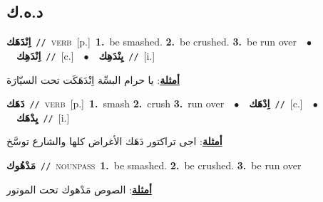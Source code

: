 \documentclass[10pt,a4paper,twoside]{article} %
\begin{document}
\begin{multicols}{2}
\vspace{-3mm}
\subsection*{\color{blue}\foreignlanguage{arabic}{د.ه.ك}\color{blue}{}} 

{\setlength\topsep{0pt}\textbf{\foreignlanguage{arabic}{اِنْدَهَك}}\ {\color{gray}\texttt{//}\color{black}}\ \textsc{verb}\ [p.]\ \textbf{1.}~be smashed.  \textbf{2.}~be crushed.  \textbf{3.}~be run over\ \ $\bullet$\ \ \setlength\topsep{0pt}\textbf{\foreignlanguage{arabic}{اِنْدَهِك}}\ {\color{gray}\texttt{//}\color{black}}\ [c.]\ \ $\bullet$\ \ \setlength\topsep{0pt}\textbf{\foreignlanguage{arabic}{يِنْدَهِك}}\ {\color{gray}\texttt{//}\color{black}}\ [i.]\  \begin{flushright}\color{gray}\foreignlanguage{arabic}{\textbf{\underline{\foreignlanguage{arabic}{أمثلة}}}: يا حرام البسِّة اِنْدَهَكَت تحت السيّارَة}\end{flushright}\color{black}} \vspace{2mm}

{\setlength\topsep{0pt}\textbf{\foreignlanguage{arabic}{دَهَك}}\ {\color{gray}\texttt{//}\color{black}}\ \textsc{verb}\ [p.]\ \textbf{1.}~smash  \textbf{2.}~crush  \textbf{3.}~run over\ \ $\bullet$\ \ \setlength\topsep{0pt}\textbf{\foreignlanguage{arabic}{اِدْهَك}}\ {\color{gray}\texttt{//}\color{black}}\ [c.]\ \ $\bullet$\ \ \setlength\topsep{0pt}\textbf{\foreignlanguage{arabic}{يِدْهَك}}\ {\color{gray}\texttt{//}\color{black}}\ [i.]\  \begin{flushright}\color{gray}\foreignlanguage{arabic}{\textbf{\underline{\foreignlanguage{arabic}{أمثلة}}}: اجى تراكتور دَهَك الأغراض كلها والشارع توسَّخ}\end{flushright}\color{black}} \vspace{2mm}

{\setlength\topsep{0pt}\textbf{\foreignlanguage{arabic}{مَدْهُوك}}\ {\color{gray}\texttt{//}\color{black}}\ \textsc{noun\textunderscore pass}\ \textbf{1.}~be smashed.  \textbf{2.}~be crushed.  \textbf{3.}~be run over\  \begin{flushright}\color{gray}\foreignlanguage{arabic}{\textbf{\underline{\foreignlanguage{arabic}{أمثلة}}}: الصوص مَدْهوك تحت الموتور}\end{flushright}\color{black}} \vspace{2mm}


\end{multicols}
\end{document}
